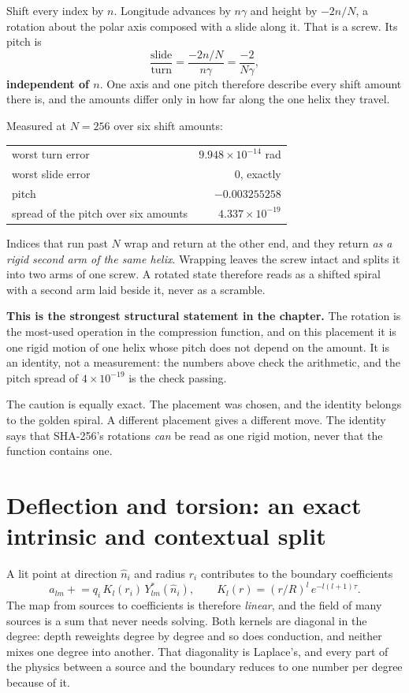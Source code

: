 Shift every index by \(n\). Longitude advances by \(n\gamma\) and height by \(-2n/N\), a rotation about the polar axis composed with a slide along it. That is a screw. Its pitch is
\[
  \frac{\text{slide}}{\text{turn}} = \frac{-2n/N}{n\gamma} = \frac{-2}{N\gamma},
\]
\textbf{independent of \(n\)}. One axis and one pitch therefore describe every shift amount there is, and the amounts differ only in how far along the one helix they travel.

Measured at \(N = 256\) over six shift amounts:

\begin{center}
\begin{tabular}{lr}
\toprule
worst turn error & \(9.948 \times 10^{-14}\) rad \\
worst slide error & \(0\), exactly \\
pitch & \(-0.003255258\) \\
spread of the pitch over six amounts & \(4.337 \times 10^{-19}\) \\
\bottomrule
\end{tabular}
\end{center}

Indices that run past \(N\) wrap and return at the other end, and they return \emph{as a rigid second arm of the same helix}. Wrapping leaves the screw intact and splits it into two arms of one screw. A rotated state therefore reads as a shifted spiral with a second arm laid beside it, never as a scramble.

\textbf{This is the strongest structural statement in the chapter.} The rotation is the most-used operation in the compression function, and on this placement it is one rigid motion of one helix whose pitch does not depend on the amount. It is an identity, not a measurement: the numbers above check the arithmetic, and the pitch spread of \(4 \times 10^{-19}\) is the check passing.

The caution is equally exact. The placement was chosen, and the identity belongs to the golden spiral. A different placement gives a different move. The identity says that SHA-256's rotations \emph{can} be read as one rigid motion, never that the function contains one.

\section{Deflection and torsion: an exact intrinsic and contextual split}

A lit point at direction \(\hat n_i\) and radius \(r_i\) contributes to the boundary coefficients
\[
  a_{lm} \mathrel{+}= q_i \, K_l(r_i) \, Y_{lm}^{*}(\hat n_i),
  \qquad
  K_l(r) = (r/R)^{l} \, e^{-l(l+1)\tau}.
\]
The map from sources to coefficients is therefore \emph{linear}, and the field of many sources is a sum that never needs solving. Both kernels are diagonal in the degree: depth reweights degree by degree and so does conduction, and neither mixes one degree into another. That diagonality is Laplace's, and every part of the physics between a source and the boundary reduces to one number per degree because of it.

